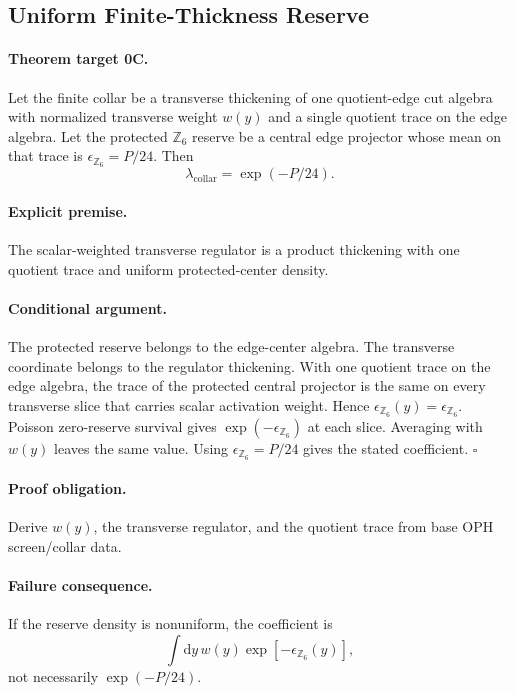 \documentclass[11pt]{article}
\newcommand{\lambdac}{\lambda_{\mathrm{collar}}}
\newcommand{\Zsix}{\mathbb Z_6}
\newcommand{\dd}{\mathrm{d}}
\begin{document}
\subsection{Uniform Finite-Thickness Reserve}

\paragraph{Theorem target 0C.}
Let the finite collar be a transverse thickening of one quotient-edge cut
algebra with normalized transverse weight \(w(y)\) and a single quotient trace
on the edge algebra.  Let the protected \(\Zsix\) reserve be a central edge
projector whose mean on that trace is \(\epsilon_{\Zsix}=P/24\).  Then
\begin{equation}
  \lambdac=\exp(-P/24).
\end{equation}

\paragraph{Explicit premise.}
The scalar-weighted transverse regulator is a product thickening with one
quotient trace and uniform protected-center density.

\paragraph{Conditional argument.}
The protected reserve belongs to the edge-center algebra.  The transverse
coordinate belongs to the regulator thickening.  With one quotient trace on the
edge algebra, the trace of the protected central projector is the same on every
transverse slice that carries scalar activation weight.  Hence
\(\epsilon_{\Zsix}(y)=\epsilon_{\Zsix}\).  Poisson zero-reserve survival gives
\(\exp(-\epsilon_{\Zsix})\) at each slice.  Averaging with \(w(y)\) leaves the
same value.  Using \(\epsilon_{\Zsix}=P/24\) gives the stated coefficient.
\(\square\)

\paragraph{Proof obligation.}
Derive \(w(y)\), the transverse regulator, and the quotient trace from base OPH
screen/collar data.

\paragraph{Failure consequence.}
If the reserve density is nonuniform, the coefficient is
\[
  \int\dd y\,w(y)\exp[-\epsilon_{\Zsix}(y)],
\]
not necessarily \(\exp(-P/24)\).
\end{document}
